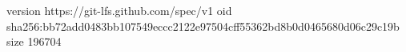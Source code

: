 version https://git-lfs.github.com/spec/v1
oid sha256:bb72add0483bb107549eccc2122e97504cff55362bd8b0d0465680d06c29c19b
size 196704

